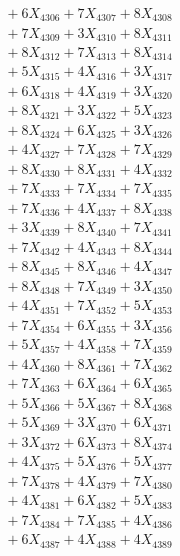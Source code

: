 \documentclass[a4paper,10pt]{article}
\begin{document}
{\begin{align}
&\;  + 6 X_{4306} + 7 X_{4307} + 8 X_{4308} \\[0.3ex]
&\;  + 7 X_{4309} + 3 X_{4310} + 8 X_{4311} \\[0.3ex]
&\;  + 8 X_{4312} + 7 X_{4313} + 8 X_{4314} \\[0.3ex]
&\;  + 5 X_{4315} + 4 X_{4316} + 3 X_{4317} \\[0.3ex]
&\;  + 6 X_{4318} + 4 X_{4319} + 3 X_{4320} \\[0.3ex]
&\;  + 8 X_{4321} + 3 X_{4322} + 5 X_{4323} \\[0.3ex]
&\;  + 8 X_{4324} + 6 X_{4325} + 3 X_{4326} \\[0.3ex]
&\;  + 4 X_{4327} + 7 X_{4328} + 7 X_{4329} \\[0.5ex]\allowbreak
&\;  + 8 X_{4330} + 8 X_{4331} + 4 X_{4332} \\[0.3ex]
&\;  + 7 X_{4333} + 7 X_{4334} + 7 X_{4335} \\[0.3ex]
&\;  + 7 X_{4336} + 4 X_{4337} + 8 X_{4338} \\[0.3ex]
&\;  + 3 X_{4339} + 8 X_{4340} + 7 X_{4341} \\[0.3ex]
&\;  + 7 X_{4342} + 4 X_{4343} + 8 X_{4344} \\[0.3ex]
&\;  + 8 X_{4345} + 8 X_{4346} + 4 X_{4347} \\[0.3ex]
&\;  + 8 X_{4348} + 7 X_{4349} + 3 X_{4350} \\[0.3ex]
&\;  + 4 X_{4351} + 7 X_{4352} + 5 X_{4353} \\[0.3ex]
&\;  + 7 X_{4354} + 6 X_{4355} + 3 X_{4356} \\[0.3ex]
&\;  + 5 X_{4357} + 4 X_{4358} + 7 X_{4359} \\[0.5ex]\allowbreak
&\;  + 4 X_{4360} + 8 X_{4361} + 7 X_{4362} \\[0.3ex]
&\;  + 7 X_{4363} + 6 X_{4364} + 6 X_{4365} \\[0.3ex]
&\;  + 5 X_{4366} + 5 X_{4367} + 8 X_{4368} \\[0.3ex]
&\;  + 5 X_{4369} + 3 X_{4370} + 6 X_{4371} \\[0.3ex]
&\;  + 3 X_{4372} + 6 X_{4373} + 8 X_{4374} \\[0.3ex]
&\;  + 4 X_{4375} + 5 X_{4376} + 5 X_{4377} \\[0.3ex]
&\;  + 7 X_{4378} + 4 X_{4379} + 7 X_{4380} \\[0.3ex]
&\;  + 4 X_{4381} + 6 X_{4382} + 5 X_{4383} \\[0.3ex]
&\;  + 7 X_{4384} + 7 X_{4385} + 4 X_{4386} \\[0.3ex]
&\;  + 6 X_{4387} + 4 X_{4388} + 4 X_{4389} \\[0.5ex]\allowbreak

\end{align}}
\end{document}
